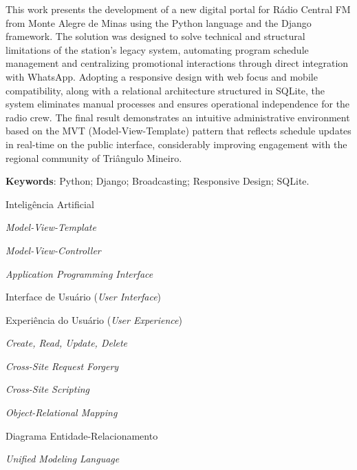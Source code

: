 \documentclass[12pt, openright, oneside, a4paper, brazil]{ads-unipac-abntex2}
\begin{document}
\begin{resumo}[Abstract]
This work presents the development of a new digital portal for Rádio Central FM from Monte Alegre de Minas using the Python language and the Django framework. The solution was designed to solve technical and structural limitations of the station's legacy system, automating program schedule management and centralizing promotional interactions through direct integration with WhatsApp. Adopting a responsive design with web focus and mobile compatibility, along with a relational architecture structured in SQLite, the system eliminates manual processes and ensures operational independence for the radio crew. The final result demonstrates an intuitive administrative environment based on the MVT (Model-View-Template) pattern that reflects schedule updates in real-time on the public interface, considerably improving engagement with the regional community of Triângulo Mineiro. 

\vspace{\onelineskip}
    
 \noindent
 \textbf{Keywords}: Python; Django; Broadcasting; Responsive Design; SQLite.
\end{resumo}

\listoffigures*
\cleardoublepage

\listoftables*
\cleardoublepage

\begin{siglas}
  \item[IA] Inteligência Artificial
  \item[MVT] \textit{Model-View-Template}
  \item[MVC] \textit{Model-View-Controller}
  \item[API] \textit{Application Programming Interface}
  \item[UI] Interface de Usuário (\textit{User Interface})
  \item[UX] Experiência do Usuário (\textit{User Experience})
  \item[CRUD] \textit{Create, Read, Update, Delete}
  \item[CSRF] \textit{Cross-Site Request Forgery}
  \item[XSS] \textit{Cross-Site Scripting}
  \item[ORM] \textit{Object-Relational Mapping}
  \item[DER] Diagrama Entidade-Relacionamento
  \item[UML] \textit{Unified Modeling Language}
\end{siglas}
\end{document}
